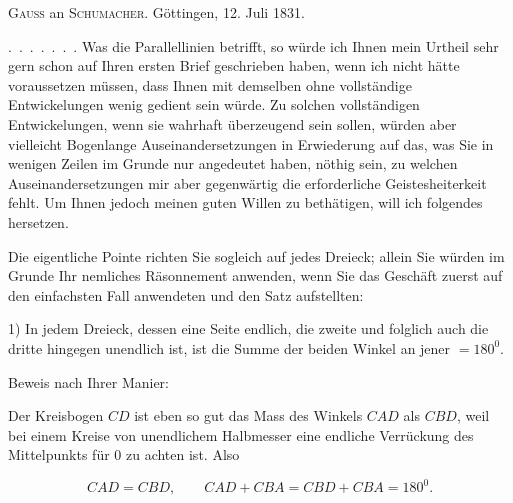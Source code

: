 

%
\begin{center}
\textsc{Gauss} an \textsc{Schumacher}. Göttingen, 12. Juli 1831.
\end{center}

\mbox{.\ .\ .\ .\ .\ .\ .} Was die Parallellinien betrifft, so würde ich Ihnen mein Urtheil sehr gern schon auf Ihren ersten Brief geschrieben haben, wenn ich nicht hätte voraussetzen müssen, dass Ihnen mit demselben ohne vollständige Entwickelungen wenig gedient sein würde. Zu solchen vollständigen Entwickelungen, wenn sie wahrhaft überzeugend sein sollen, würden aber vielleicht Bogenlange 
Auseinandersetzungen in Erwiederung auf das, was Sie in wenigen Zeilen im Grunde nur angedeutet haben, nöthig sein, zu welchen Auseinandersetzungen mir aber gegenwärtig die erforderliche Geistesheiterkeit fehlt. Um Ihnen jedoch meinen guten Willen zu bethätigen, will ich folgendes hersetzen.

Die eigentliche Pointe richten Sie sogleich auf jedes Dreieck; allein Sie würden im Grunde Ihr nemliches Räsonnement anwenden, wenn Sie das Geschäft zuerst auf den einfachsten Fall anwendeten und den Satz aufstellten:

1) In jedem Dreieck, dessen eine Seite endlich, die zweite und folglich auch die dritte hingegen unendlich ist, ist die Summe der beiden Winkel an jener $=180^0$.

\begin{center}

\end{center}

Beweis nach Ihrer Manier:

Der Kreisbogen $CD$ ist eben so gut das Mass des Winkels $CAD$ als $CBD$, weil bei einem Kreise von unendlichem Halbmesser eine endliche Verrückung des Mittelpunkts für $0$ zu achten ist. Also

\[ CAD = CBD, \qquad CAD + CBA = CBD + CBA = 180^0. \]

